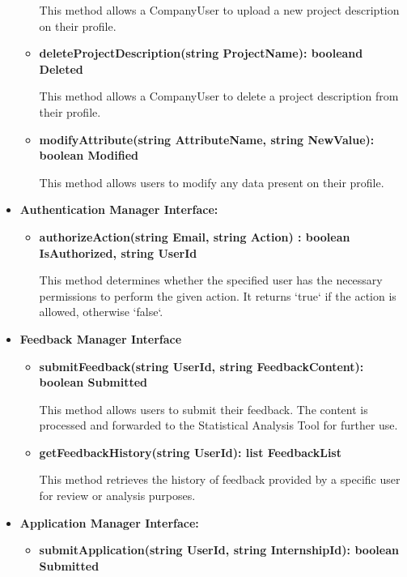 \begin{itemize}
\begin{itemize}
    This method allows a CompanyUser to upload a new project description on their profile.

    \item \textbf{deleteProjectDescription(string ProjectName): booleand Deleted}
    
    This method allows a CompanyUser to delete a project description from their profile.

    \item \textbf{modifyAttribute(string AttributeName, string NewValue): boolean Modified}
    
    This method allows users to modify any data present on their profile.
    \end{itemize}

\item \textbf{Authentication Manager Interface:}
\begin{itemize}

\item \textbf{authorizeAction(string Email, string Action) : boolean IsAuthorized, string UserId}  

This method determines whether the specified user has the necessary permissions to perform the given action. It returns `true` if the action is allowed, otherwise `false`.


\end{itemize}

\item \textbf{Feedback Manager Interface}
    \begin{itemize}

    \item \textbf{submitFeedback(string UserId, string FeedbackContent): boolean Submitted}

    This method allows users to submit their feedback. The content is processed and forwarded to the Statistical Analysis Tool for further use.

    \item \textbf{getFeedbackHistory(string UserId): list FeedbackList}

    This method retrieves the history of feedback provided by a specific user for review or analysis purposes.
    \end{itemize}
\item \textbf{Application Manager Interface:}
\begin{itemize}
    \item \textbf{submitApplication(string UserId, string InternshipId): boolean Submitted}


\end{itemize}
\end{itemize}
